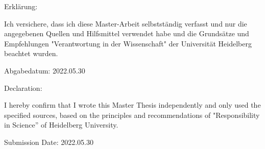 \setlength{\parindent}{0em}

Erkl\"{a}rung:\par
\vspace{2\baselineskip}
Ich versichere, dass ich diese Master-Arbeit selbstst\"{a}ndig verfasst und nur die angegebenen
Quellen und Hilfsmittel verwendet habe und die Grunds\"{a}tze und Empfehlungen "Verantwortung in der Wissenschaft" der Universit\"{a}t Heidelberg beachtet wurden. 

\vspace*{50pt}
\noindent

\underline{\phantom{mmmmmmmmmmmmmmmmmmmm}}

\medskip
\noindent
 
Abgabedatum: 2022.05.30





\vspace{10\baselineskip}

Declaration:\par
\vspace{2\baselineskip}
I hereby confirm that I wrote this Master Thesis independently and only used the specified sources, based on the principles and recommendations of "Responsibility in Science'' of Heidelberg University.
\par

\vspace*{50pt}
\noindent

\underline{\phantom{mmmmmmmmmmmmmmmmmmmm}}

\medskip
\noindent 
Submission Date: 2022.05.30



\newpage
